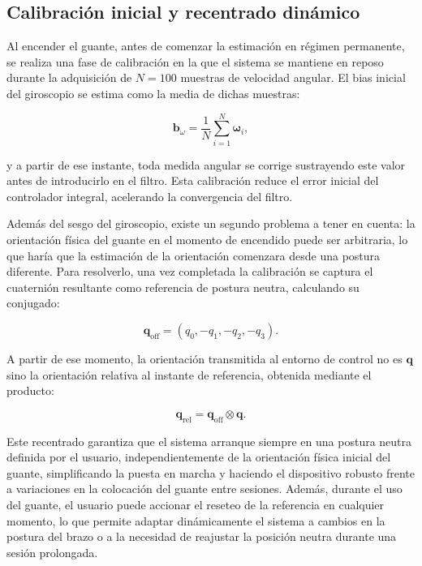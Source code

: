 \documentclass[12pt]{article}
\begin{document}
\subsection{Calibración inicial y recentrado dinámico}

Al encender el guante, antes de comenzar la estimación en régimen permanente, se realiza una fase de calibración en la que el sistema se mantiene en reposo durante la adquisición de $N = 100$ muestras de velocidad angular. El bias inicial del giroscopio se estima como la media de dichas muestras:

\begin{equation}
\mathbf{b}_\omega = \frac{1}{N} \sum_{i=1}^{N} \boldsymbol{\omega}_i,
\end{equation}

y a partir de ese instante, toda medida angular se corrige sustrayendo este valor antes de introducirlo en el filtro. Esta calibración reduce el error inicial del controlador
integral, acelerando la convergencia del filtro.

Además del sesgo del giroscopio, existe un segundo problema a tener en cuenta: la orientación física del guante en el momento de encendido puede ser arbitraria, lo que haría que la estimación de la orientación comenzara desde una postura diferente. Para resolverlo, una vez completada la calibración se captura el cuaternión resultante como referencia de postura neutra, calculando su conjugado:

\begin{equation}
\mathbf{q}_{\text{off}} = (q_0, -q_1, -q_2, -q_3).
\end{equation}

A partir de ese momento, la orientación transmitida al entorno de control no es $\mathbf{q}$ sino la orientación relativa al instante de referencia, obtenida mediante el producto:

\begin{equation}
\mathbf{q}_{\text{rel}} = \mathbf{q}_{\text{off}} \otimes \mathbf{q}.
\end{equation}

Este recentrado garantiza que el sistema arranque siempre en una postura neutra definida por el usuario, independientemente de la orientación física inicial del guante, simplificando la puesta en marcha y haciendo el dispositivo robusto frente a variaciones en la colocación del guante entre sesiones. Además, durante el uso del guante, el usuario puede accionar el reseteo de la referencia en cualquier momento, lo que permite adaptar dinámicamente el sistema a cambios en la postura del brazo o a la necesidad de reajustar la posición neutra durante una sesión prolongada.
\end{document}
